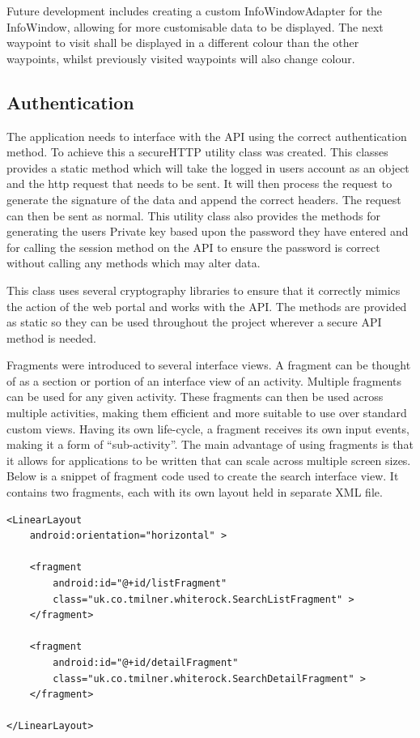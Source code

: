 \documentclass[11pt,a4paper]{article}
\begin{document}
Future development includes creating a custom InfoWindowAdapter for the InfoWindow, allowing for more customisable data to be displayed. The next waypoint to visit shall be displayed in a different colour than the other waypoints, whilst previously visited waypoints will also change colour.

\subsection{Authentication}
\label{sec:authorisation}
The application needs to interface with the API using the correct authentication method. To achieve this a secureHTTP utility class was created. This classes provides a static method which will take the logged in users account as an object and the http request that needs to be sent. It will then process the request to generate the signature of the data and append the correct headers. The request can then be sent as normal. This utility class also provides the methods for generating the users Private key based upon the password they have entered and for calling the session method on the API to ensure the password is correct without calling any methods which may alter data. 

This class uses several cryptography libraries to ensure that it correctly mimics the action of the web portal and works with the API. The methods are provided as static so they can be used throughout the project wherever a secure API method is needed.

Fragments were introduced to several interface views. A fragment can be thought of as a section or portion of an interface view of an activity. Multiple fragments can be used for any given activity. These fragments can then be used across multiple activities, making them efficient and more suitable to use over standard custom views. Having its own life-cycle, a fragment receives its own input events, making it a form of ``sub-activity''. The main advantage of using fragments is that it allows for applications to be written that can scale across multiple screen sizes. Below is a snippet of fragment code used to create the search interface view. It contains two fragments, each with its own layout held in separate XML file.

\begin{lstlisting}[captionpos=b, caption=Fragment Code Snippet, label=lst:Fragment Code Snippet, frame=single]
<LinearLayout
    android:orientation="horizontal" >

    <fragment
        android:id="@+id/listFragment"
        class="uk.co.tmilner.whiterock.SearchListFragment" >
    </fragment>

    <fragment
        android:id="@+id/detailFragment"
        class="uk.co.tmilner.whiterock.SearchDetailFragment" >
    </fragment>

</LinearLayout>
\end{lstlisting}
\end{document}
